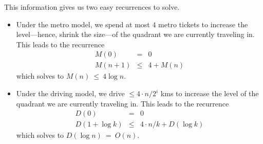 \begin{itemize}
{This information gives us two easy recurrences to solve.

\begin{itemize}
\item
Under the metro model, we spend at most $4$ metro tickets to increase the level---hence, shrink the size---of the quadrant we are currently traveling in.  This leads to the recurrence
\begin{eqnarray*}
M(0) & = & 0 \\
M(n+1) & \leq & 4 + M(n)
\end{eqnarray*}
which solves to $M(n) \ \leq \ 4 \log n$.

\medskip\item
Under the driving model, we drive $\leq 4 \cdot n/2^i$ kms to increase the level of the quadrant we are currently traveling in.  This leads to the recurrence
\begin{eqnarray*}
D(0) & = & 0 \\
D(1 + \log k) & \leq & 4  \cdot n/ k + D(\log k)
\end{eqnarray*}
which solves to $D(\log n) \ = \ O(n)$. 
\end{itemize}

}
\end{itemize}
